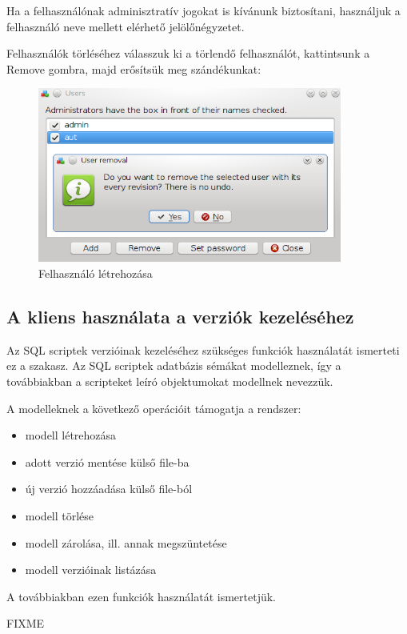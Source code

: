 \documentclass[a4paper,12pt]{article}
\begin{document}
Ha a felhasználónak adminisztratív jogokat is kívánunk biztosítani, használjuk
a felhasználó neve mellett elérhető jelölőnégyzetet.

Felhasználók törléséhez válasszuk ki a törlendő felhasználót, kattintsunk a
Remove gombra, majd erősítsük meg szándékunkat:

\begin{figure}[H]
\centering
\includegraphics[width=100mm,keepaspectratio]{user-delete.png}
\caption{Felhasználó létrehozása}
\end{figure}

\subsection{A kliens használata a verziók kezeléséhez}

Az SQL scriptek verzióinak kezeléséhez szükséges funkciók használatát ismerteti
ez a szakasz. Az SQL scriptek adatbázis sémákat modelleznek, így a továbbiakban
a scripteket leíró objektumokat modellnek nevezzük.

A modelleknek a következő operációit támogatja a rendszer:

\begin{itemize}
\item modell létrehozása
\item adott verzió mentése külső file-ba
\item új verzió hozzáadása külső file-ból
\item modell törlése
\item modell zárolása, ill. annak megszüntetése
\item modell verzióinak listázása
\end{itemize}

A továbbiakban ezen funkciók használatát ismertetjük.

FIXME
\end{document}

